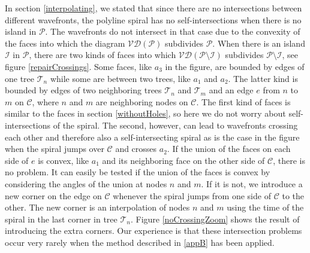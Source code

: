 \documentclass[3p]{elsarticle}
\newcommand{\VD}{\mathcal{VD}}
\newcommand{\PP}{\mathcal{P}}
\newcommand{\HH}{\mathcal{I}}
\newcommand{\CC}{\mathcal{C}}
\newcommand{\TT}{\mathcal{T}}
\begin{document}
In section \ref{interpolating}, we stated that since there are no intersections between different
wavefronts,
the polyline spiral has no self-intersections when there is no island in $\PP$.
The wavefronts do not intersect in that
case due to the convexity of the faces into which the diagram $\VD(\PP)$ subdivides $\PP$.
When there is an island $\HH$ in $\PP$,
there are two kinds of faces into which $\VD(\PP\setminus\HH)$ subdivides $\PP\setminus\HH$,
see figure \ref{repairCrossings}. Some faces, like $a_3$ in the figure, are bounded
by edges of one tree $\TT_n$ while some are between two trees,
like $a_1$ and $a_2$. The latter kind is bounded by edges of two
neighboring
trees $\TT_n$ and $\TT_m$ and an edge $e$ from $n$ to $m$ on $\CC$, where $n$ and $m$ are neighboring nodes on $\CC$.
The first kind of faces is similar to the faces in section \ref{withoutHoles},
so here we do not worry about
self-intersections of the spiral. The second, however, can lead to wavefronts crossing each other and
therefore also a self-intersecting spiral as is the case in the figure when the spiral jumps over $\CC$ and
crosses $a_2$. If the union of
the faces on each side of $e$ is convex,
like $a_1$ and its neighboring face on the other side of $\CC$, there is no problem.
It can easily be tested if the union of the faces is convex by considering the angles of the union
at nodes $n$ and $m$. If it is not, we introduce a new corner
on the edge on $\CC$ whenever the spiral jumps from one side of $\CC$
to the other. The new corner is an interpolation of nodes $n$ and $m$
using the time of the spiral in the last corner in tree $\TT_n$.
Figure \ref{noCrossingZoom} shows the result of introducing
the extra corners. Our experience is that these intersection problems occur very rarely
when the method described in \ref{appB} has been applied.

\begin{figure*}
\centering
{}\\
\quad
{}
\caption{
The same pocket and island as in figure \ref{holeWavefronts}.
The cycle $\CC$ is blue, the other edges of $\VD$ are gray.
The interpolated spiral is black, and we have not introduced extra spiral corners on
$\CC$ to avoid self-intersections.
In order to emphasize the intersection problems that can arise,
we have not used the method described in \ref{appB},
but merely used the preferred time and speed of each node (section \ref{defMovement}).
 is a close-up of 
of the area in the red rectangle. In , we have introduced new corners on
$\CC$ when the spiral jumps from one side of $\CC$ to the other when the union of the two
faces on each side of $\CC$ is not convex.
}
\label{repairCrossings}
\end{figure*}
\end{document}
